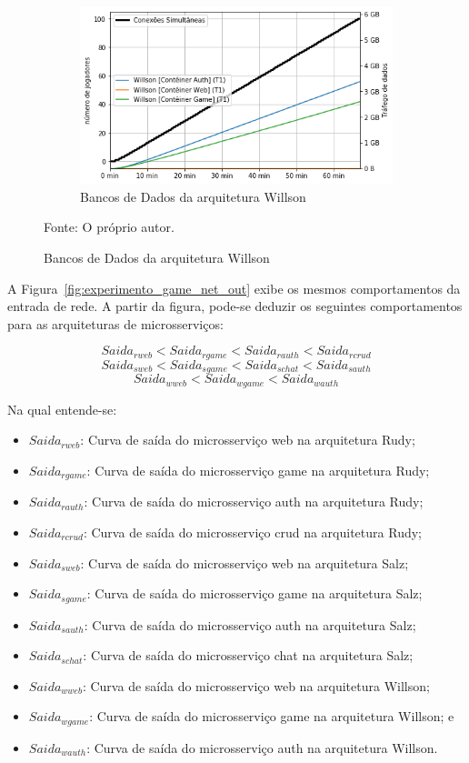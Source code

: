 \begin{figure}[htb!]
    \begin{subfigure}{0.5\textwidth}
        \centering
        \includegraphics[width=.95\linewidth]{figuras/analise/rt/w_net_out_arch.png}
        \caption{Bancos de Dados da arquitetura Willson}
        \label{fig:w_netout_arch}
    \end{subfigure}

    Fonte: O próprio autor.
\end{figure}

A Figura~\ref{fig:experimento_game_net_out} exibe os mesmos comportamentos da entrada de rede.
%
A partir da figura, pode-se deduzir os seguintes comportamentos para as arquiteturas de microsserviços:

$$
     Saida_{rweb} < Saida_{rgame} < Saida_{rauth} < Saida_{rcrud}
$$
$$
     Saida_{sweb} < Saida_{sgame} < Saida_{schat} < Saida_{sauth}
$$
$$
     Saida_{wweb} < Saida_{wgame} < Saida_{wauth}
$$

Na qual entende-se:

\begin{itemize}
 \item $Saida_{rweb}$: Curva de saída do microsserviço web na arquitetura Rudy;
 \item $Saida_{rgame}$: Curva de saída do microsserviço game na arquitetura Rudy;
 \item $Saida_{rauth}$: Curva de saída do microsserviço auth na arquitetura Rudy;
 \item $Saida_{rcrud}$: Curva de saída do microsserviço crud na arquitetura Rudy;
  \item $Saida_{sweb}$: Curva de saída do microsserviço web na arquitetura Salz;
 \item $Saida_{sgame}$: Curva de saída do microsserviço game na arquitetura Salz;
 \item $Saida_{sauth}$: Curva de saída do microsserviço auth na arquitetura Salz;
 \item $Saida_{schat}$: Curva de saída do microsserviço chat na arquitetura Salz;
 \item $Saida_{wweb}$: Curva de saída do microsserviço web na arquitetura Willson;
 \item $Saida_{wgame}$: Curva de saída do microsserviço game na arquitetura Willson; e
 \item $Saida_{wauth}$: Curva de saída do microsserviço auth na arquitetura Willson.
\end{itemize}

